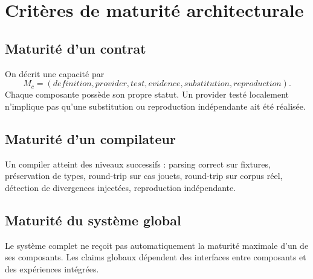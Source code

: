 \chapter{Critères de maturité architecturale}

\section{Maturité d'un contrat}

On décrit une capacité par
\[
M_c=(definition,provider,test,evidence,substitution,reproduction).
\]
Chaque composante possède son propre statut. Un provider testé localement n'implique pas qu'une substitution ou reproduction indépendante ait été réalisée.

\section{Maturité d'un compilateur}

Un compiler atteint des niveaux successifs : parsing correct sur fixtures, préservation de types, round-trip sur cas jouets, round-trip sur corpus réel, détection de divergences injectées, reproduction indépendante.

\section{Maturité du système global}

Le système complet ne reçoit pas automatiquement la maturité maximale d'un de ses composants. Les claims globaux dépendent des interfaces entre composants et des expériences intégrées.